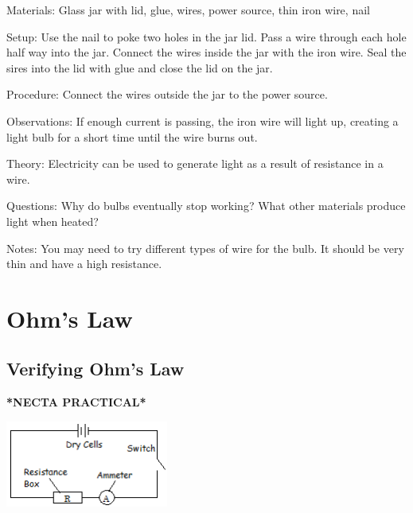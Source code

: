 \begin{multicols}{2}
\begin{description*}
\item[Materials:]{Glass jar with lid, glue, wires, power source, thin iron wire, nail}
\item[Setup:]{Use the nail to poke two holes in the jar lid. Pass a wire through each hole half way into the jar. Connect the wires inside the jar with the iron wire. Seal the sires into the lid with glue and close the lid on the jar.}
\item[Procedure:]{Connect the wires outside the jar to the power source.}
\item[Observations:]{If enough current is passing, the iron wire will light up, creating a light bulb for a short time until the wire burns out.}
\item[Theory:]{Electricity can be used to generate light as a result of resistance in a wire.}
\item[Questions:]{Why do bulbs eventually stop working? What other materials produce light when heated?}
\item[Notes:]{You may need to try different types of wire for the bulb. It should be very thin and have a high resistance.}
\end{description*}


\section*{Ohm's Law}


\subsection{Verifying Ohm's Law}
\textbf{*NECTA PRACTICAL*}

\begin{center}
\includegraphics[width=0.4\textwidth]{./img/ohms-law.png}
\end{center}


\end{multicols}
